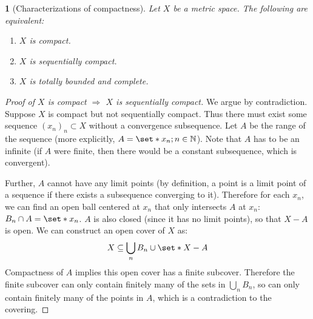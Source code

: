 \documentclass[12pt]{article}
\numberwithin{equation}{section}
\theoremstyle{plain}
\newtheorem{theorem}{\color{ForestGreen}{\textbf{Theorem}}}[section]
\theoremstyle{definition}
\def\Set{\set*}%
\def\ss{\subset}
\def\imp{\Rightarrow}
\newcommand{\1}{\mathbbm 1}
\newcommand{\NN}{\mathbb N}
\begin{document}
\begin{theorem}[Characterizations of compactness]
	Let $X$ be a metric space. The following are equivalent:
	\begin{enumerate}
		\item $X$ is compact.
		\item $X$ is sequentially compact.
		\item $X$ is totally bounded and complete. 
	\end{enumerate}
\end{theorem}

\begin{proof}[Proof of $X$ is compact $\imp$ $X$ is sequentially compact]
	We argue by contradiction. Suppose $X$ is compact but not sequentially compact. Thus there must exist some sequence $(x_n)_n \ss X$ without a convergence subsequence. Let $A$ be the range of the sequence (more explicitly, $A = \Set{x_n; n \in \NN}$). Note that $A$ has to be an infinite (if $A$ were finite, then there would be a constant subsequence, which is convergent). 

	Further, $A$ cannot have any limit points (by definition, a point is a limit point of a sequence if there exists a subsequence converging to it). Therefore for each $x_n$, we can find an open ball centered at $x_n$ that only intersects $A$ at $x_n$: $B_n \cap A = \Set{x_n}$. $A$ is also closed (since it has no limit points), so that $X-A$ is open. We can construct an open cover of $X$ as:
	\begin{equation}
		X \subseteq \bigcup_{n} B_n \cup \Set{X-A}
	\end{equation}
	Compactness of $A$ implies this open cover has a finite subcover. Therefore the finite subcover can only contain finitely many of the sets in $\bigcup_{n} B_n$, so can only contain finitely many of the points in $A$, which is a contradiction to the covering. 
\end{proof}
\end{document}
